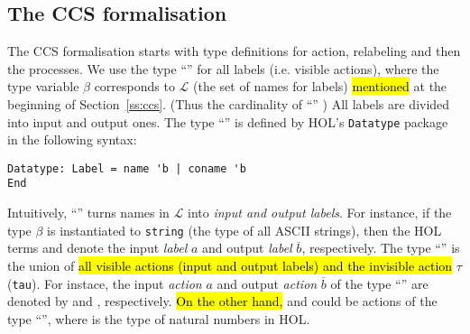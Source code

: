 
\subsection{The CCS formalisation}
\label{ss:formalCCS}

The CCS formalisation starts with type definitions for action,
relabeling and then the  processes. We use the type ``''
for all labels (i.e. visible actions), where the type variable $\beta$ corresponds
to $\mathscr{L}$ (the set of names for labels) \hl{mentioned} at the beginning
of Section~\ref{ss:ccs}. (Thus the
cardinality of ``''  )
All labels are divided into input and output ones.
The type ``'' is defined by HOL's \texttt{Datatype} package in the
following syntax:
\begin{lstlisting}
Datatype: Label = name 'b | coname 'b
End
\end{lstlisting}
Intuitively, ``'' turns names in $\mathscr{L}$ into \emph{input and output labels}.
For instance, if the type $\beta$ is instantiated to \texttt{string}
(the type of all ASCII strings), then the HOL terms  and
 denote the input \emph{label} $a$ and output
\emph{label} $\overline{b}$, respectively.
The type ``'' is the
union of \hl{all visible actions (input and output labels) and the invisible action} $\tau$
(\texttt{tau}). For instace, the input \emph{action} $a$ and output
\emph{action} $\overline{b}$ of the type ``''
are denoted by  and , respectively. \hl{On the
other hand,}  and  could be actions of the type ``'', where
 is the type of natural numbers in HOL.


